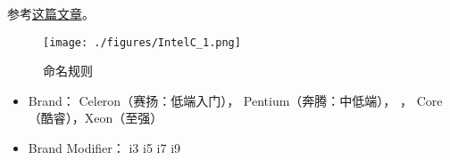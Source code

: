 
\begin{issues}
\issueDraft
\end{issues}

参考\href{https://www.itechtics.com/processor-generations/}{这篇文章}。

\begin{figure}[ht]
\centering
\texttt{[image: ./figures/IntelC\_1.png]}
\caption{命名规则} \label{IntelC_fig1}
\end{figure}

\begin{itemize}
\item Brand： Celeron（赛扬：低端入门）， Pentium（奔腾：中低端）， ， Core（酷睿），Xeon（至强）
\item Brand Modifier： i3 i5 i7 i9
\end{itemize}
